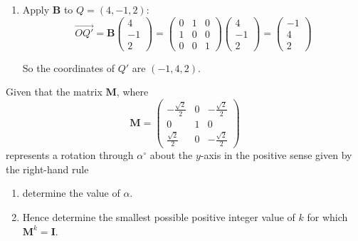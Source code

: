 \documentclass[leqno]{article}
\begin{document}
\begin{enumerate}[
  label=\textbf{\arabic*.},
  leftmargin=*,
  topsep=0pt,
  partopsep=0pt,
  parsep=0pt
]
\begin{djsSolution}
\begin{enumerate}[label=\textbf{(\alph*)}]
Therefore
\[
\mathbf{B}=
\begin{pmatrix}
0 & 1 & 0\\
1 & 0 & 0\\
0 & 0 & 1
\end{pmatrix}
\]

  \item Apply \(\mathbf{B}\) to \(Q=(4,-1,2)\):
\[
\overrightarrow{OQ'}
=
\mathbf{B}
\begin{pmatrix}
4\\
-1\\
2
\end{pmatrix}
=
\begin{pmatrix}
0 & 1 & 0\\
1 & 0 & 0\\
0 & 0 & 1
\end{pmatrix}
\begin{pmatrix}
4\\
-1\\
2
\end{pmatrix}
=
\begin{pmatrix}
-1\\
4\\
2
\end{pmatrix}
\]

So the coordinates of \(Q'\) are \((-1,4,2)\).
\end{enumerate}
\end{djsSolution}


\newpage

\questionitem

Given that the matrix $\mathbf{M}$, where
\[
\mathbf{M} = \begin{pmatrix}
-\frac{\sqrt{2}}{2} & 0 & -\frac{\sqrt{2}}{2} \\
0 & 1 & 0 \\
\frac{\sqrt{2}}{2} & 0 & -\frac{\sqrt{2}}{2}
\end{pmatrix}
\]
represents a rotation through $\alpha^\circ$ about the $y$-axis in the positive sense given by the right-hand rule \\

\begin{enumerate}[label=\textbf{(\alph*)}]
  \item determine the value of $\alpha$.  \\
  \item Hence determine the smallest possible positive integer value of $k$ for which $\mathbf{M}^k = \mathbf{I}$.  \\
\end{enumerate}


\end{enumerate}
\end{document}
